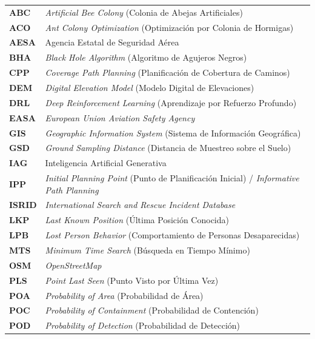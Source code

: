 \documentclass[12pt]{report} %
\begin{document}
\begin{table}[H]
\centering
\small
\renewcommand{\arraystretch}{1.15}
\begin{tabular}{ll}
\textbf{ABC} & \textit{Artificial Bee Colony} (Colonia de Abejas Artificiales) \\
\textbf{ACO} & \textit{Ant Colony Optimization} (Optimización por Colonia de Hormigas) \\
\textbf{AESA} & Agencia Estatal de Seguridad Aérea \\
\textbf{BHA} & \textit{Black Hole Algorithm} (Algoritmo de Agujeros Negros) \\
\textbf{CPP} & \textit{Coverage Path Planning} (Planificación de Cobertura de Caminos) \\
\textbf{DEM} & \textit{Digital Elevation Model} (Modelo Digital de Elevaciones) \\
\textbf{DRL} & \textit{Deep Reinforcement Learning} (Aprendizaje por Refuerzo Profundo) \\
\textbf{EASA} & \textit{European Union Aviation Safety Agency} \\
\textbf{GIS} & \textit{Geographic Information System} (Sistema de Información Geográfica) \\
\textbf{GSD} & \textit{Ground Sampling Distance} (Distancia de Muestreo sobre el Suelo) \\
\textbf{IAG} & Inteligencia Artificial Generativa \\
\textbf{IPP} & \textit{Initial Planning Point} (Punto de Planificación Inicial) / \textit{Informative Path Planning} \\
\textbf{ISRID} & \textit{International Search and Rescue Incident Database} \\
\textbf{LKP} & \textit{Last Known Position} (Última Posición Conocida) \\
\textbf{LPB} & \textit{Lost Person Behavior} (Comportamiento de Personas Desaparecidas) \\
\textbf{MTS} & \textit{Minimum Time Search} (Búsqueda en Tiempo Mínimo) \\
\textbf{OSM} & \textit{OpenStreetMap} \\
\textbf{PLS} & \textit{Point Last Seen} (Punto Visto por Última Vez) \\
\textbf{POA} & \textit{Probability of Area} (Probabilidad de Área) \\
\textbf{POC} & \textit{Probability of Containment} (Probabilidad de Contención) \\
\textbf{POD} & \textit{Probability of Detection} (Probabilidad de Detección) \\

\end{tabular}
\end{table}
\end{document}
